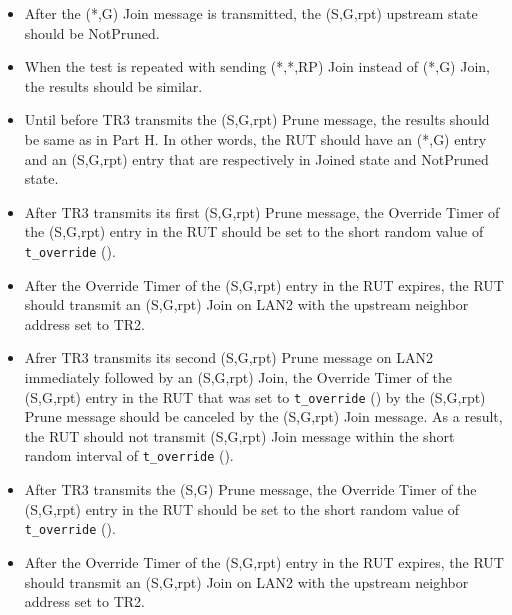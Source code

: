 \documentclass[11pt]{report}
\begin{document}
\begin{itemize}

  \item After the (*,G) Join message is transmitted, the (S,G,rpt) upstream
  state should be NotPruned.

  \item When the test is repeated with sending (*,*,RP) Join instead of (*,G)
  Join, the results should be similar.

\end{itemize}


\begin{itemize}

  \item Until before TR3 transmits the (S,G,rpt) Prune message, the results
  should be same as in Part H. In other words, the RUT should have an (*,G)
  entry and an (S,G,rpt) entry that are respectively in Joined state and
  NotPruned state.

  \item After TR3 transmits its first (S,G,rpt) Prune message, the Override
  Timer of the (S,G,rpt) entry in the RUT should be set to the short random
  value of \verb=t_override= ({\PimsmTOverride}).

  \item After the Override Timer of the (S,G,rpt) entry in the RUT expires,
  the RUT should transmit an (S,G,rpt) Join on LAN2 with the upstream neighbor
  address set to TR2.

  \item Afrer TR3 transmits its second (S,G,rpt) Prune message on LAN2
  immediately followed by an (S,G,rpt) Join, the Override Timer of the
  (S,G,rpt) entry in the RUT that was set to \verb=t_override=
  ({\PimsmTOverride}) by the (S,G,rpt) Prune message should be canceled by the
  (S,G,rpt) Join message. As a result, the RUT should not transmit (S,G,rpt)
  Join message within the short random interval of \verb=t_override=
  ({\PimsmTOverride}).

  \item After TR3 transmits the (S,G) Prune message, the Override
  Timer of the (S,G,rpt) entry in the RUT should be set to the short random
  value of \verb=t_override= ({\PimsmTOverride}).

  \item After the Override Timer of the (S,G,rpt) entry in the RUT expires,
  the RUT should transmit an (S,G,rpt) Join on LAN2 with the upstream neighbor
  address set to TR2.


\end{itemize}
\end{document}
